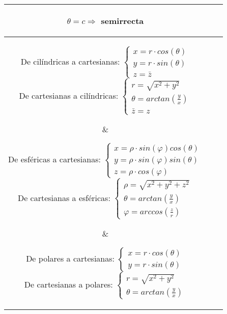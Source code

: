 \documentclass[twoside]{article}
\numberwithin{equation}{section}
\numberwithin{figure}{section}
\numberwithin{table}{section}
\begin{document}
\begin{table}[H]
\begin{tabular}{c|c|c}
{\begin{center}
										$\theta=c\Rightarrow$ semirrecta
										\end{center}} \\
					\hline
					\parbox{5cm}{\begin{center}De cilíndricas a cartesianas:
										$\begin{cases}
										x=r\cdot cos(\theta) \\
										y=r\cdot sin(\theta) \\
										z=\bar{z}\end{cases}$ \\
										De cartesianas a cilíndricas:
										$\begin{cases}
										r=\sqrt{x^2+y^2} \\
										\theta=arctan(\frac{y}{x}) \\
										\bar{z}=z\end{cases}$
										\end{center}}&
					\parbox{5cm}{\begin{center}De esféricas a cartesianas:
										$\begin{cases}
										x=\rho\cdot sin(\varphi)cos(\theta) \\
										y=\rho\cdot sin(\varphi)sin(\theta) \\
										z=\rho\cdot cos(\varphi)\end{cases}$ \\
										De cartesianas a esféricas:
										$\begin{cases}
										\rho=\sqrt{x^2+y^2+z^2} \\
										\theta=arctan(\frac{y}{x}) \\
										\varphi=arccos(\frac{z}{r})\end{cases}$
										\end{center}} & 
					\parbox{5cm}{\begin{center}De polares a cartesianas:
										$\begin{cases}
										x=r\cdot cos(\theta) \\
										y=r\cdot sin(\theta)\end{cases}$ \\
										De cartesianas a polares:
										$\begin{cases}
										r=\sqrt{x^2+y^2} \\
										\theta=arctan(\frac{y}{x})\end{cases}$
										\end{center}} \\
				\end{tabular}
			\end{table}
\end{document}
